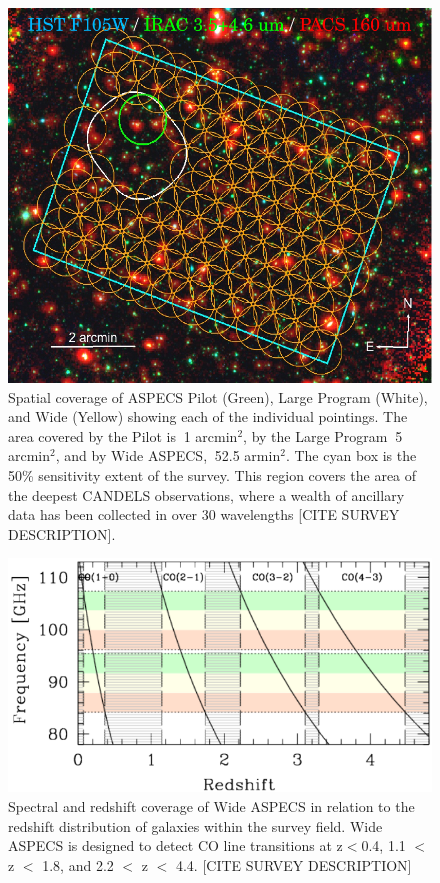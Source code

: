 \begin{figure}[tbp]
\centering \includegraphics[width=120mm]{Wide_ASPECS_Coverage.png}
\caption{Spatial coverage of ASPECS Pilot (Green), Large Program (White), and Wide (Yellow) showing each of the individual pointings. The area covered by the Pilot is $~$1 arcmin$^2$, by the Large Program $~$5 arcmin$^2$, and by Wide ASPECS, $~$52.5 armin$^2$. The cyan box is the 50\% sensitivity extent of the survey. This region covers the area of the deepest CANDELS observations, where a wealth of ancillary data has been collected in over 30 wavelengths [CITE SURVEY DESCRIPTION].}
\label{fig:ASPECS_Coverage}
\end{figure}

\begin{figure}[tbp]
\centering
\includegraphics[width=120mm]{Wide_ASPECS_Freq.png}
\caption{Spectral and redshift coverage of Wide ASPECS in relation to the redshift distribution of galaxies within the survey field. Wide ASPECS is designed to detect CO line transitions at z$<$0.4, 1.1 $<$ z $<$ 1.8, and 2.2 $<$ z $<$ 4.4. [CITE SURVEY DESCRIPTION]}
\label{fig:ASPECS_Freq}
\end{figure}

